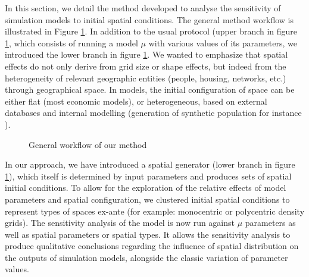 \documentclass[Afour,sageh,times]{sagej}
\begin{document}
In this section, we detail the method developed to analyse the sensitivity of simulation models to initial spatial conditions. The general method workflow is illustrated in Figure \ref{fig:method}. In addition to the usual protocol (upper branch in figure \ref{fig:method}, which consists of running a model $\mu$ with various values of its parameters, we introduced the lower branch in figure \ref{fig:method}. We wanted to emphasize that spatial effects do not only derive from grid size or shape effects, but indeed from the heterogeneity of relevant geographic entities (people, housing, networks, etc.) through geographical space. In models, the initial configuration of space can be either flat (most economic models), or heterogeneous,  based on external databases and internal modelling (generation of synthetic population for instance \citep{bhat1999activity}).
\begin{figure}[htbp] \begin{center} 
 \caption{General workflow of our method} \label{fig:method} \end{center} \end{figure} %

In our approach, we have introduced a spatial generator (lower branch in figure \ref{fig:method}), which itself is determined by input parameters and produces sets of spatial initial conditions. 
To allow for the exploration of the relative effects of model parameters and spatial configuration, we clustered initial spatial conditions  to represent types of spaces ex-ante (for example: monocentric or polycentric density grids). The sensitivity analysis of the model is now run against $\mu$ parameters as well as spatial parameters or spatial types. It allows the sensitivity analysis to produce qualitative conclusions regarding the influence of spatial distribution on the outputs of simulation models, alongside the classic variation of parameter values.
\end{document}
